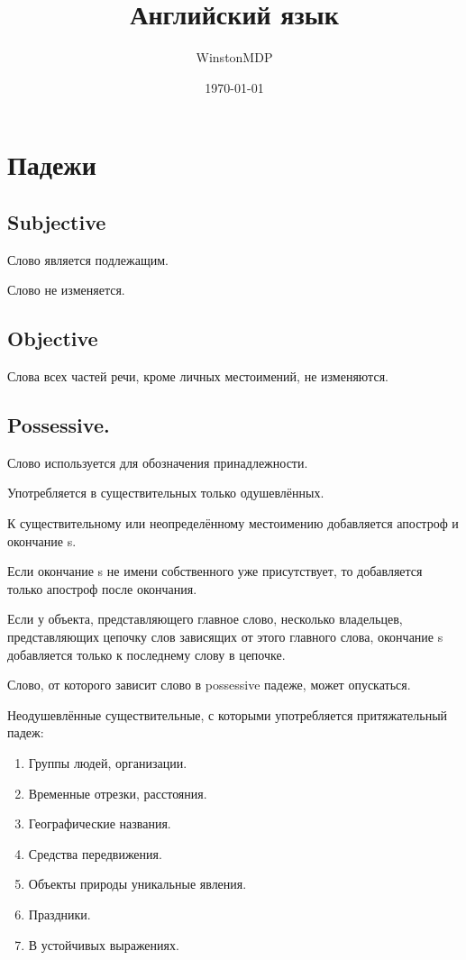 \documentclass[oneside]{book}
\title{Английский язык}
\date{\today}
\author{WinstonMDP}
\begin{document}
\maketitle

\tableofcontents

\chapter{Падежи}
\section{Subjective}
Слово является подлежащим.

Слово не изменяется.

\section{Objective}
Слова всех частей речи, кроме личных местоимений, не изменяются.

\section{Possessive.}
Слово используется для обозначения принадлежности.

Употребляется в существительных только одушевлённых.

К существительному или неопределённому местоимению добавляется  апостроф и окончание s.

Если окончание s не имени собственного уже присутствует, то добавляется
только апостроф после окончания.

Если у объекта, представляющего главное слово, несколько владельцев,
представляющих цепочку слов зависящих от этого главного слова, окончание s добавляется
только к последнему слову в цепочке.

Слово, от которого зависит слово в possessive падеже, может опускаться.

Неодушевлённые существительные,
с которыми употребляется
притяжательный падеж:
\begin{enumerate}
    \item Группы людей, организации.
    \item Временные отрезки, расстояния.
    \item Географические названия.
    \item Средства передвижения.
    \item Объекты природы уникальные явления.
    \item Праздники.
    \item В устойчивых выражениях.
\end{enumerate}
\end{document}
